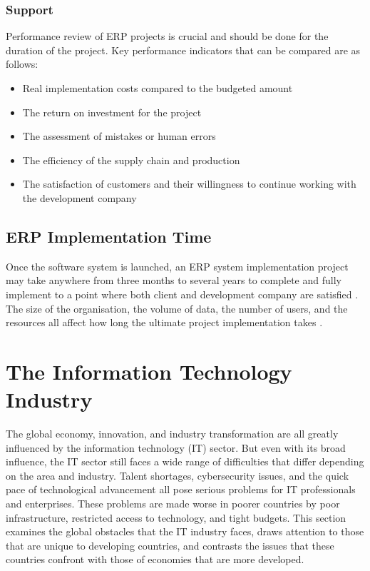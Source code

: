 \subsubsection{Support}
\par{Performance review of ERP projects is crucial and should be done for the duration of the project. Key performance indicators that can be compared are as follows:}
\begin{itemize}
    \item Real implementation costs compared to the budgeted amount
    \item The return on investment for the project
    \item The assessment of mistakes or human errors
    \item The efficiency of the supply chain and production
    \item The satisfaction of customers and their willingness to continue working with the development company
\end{itemize}
\subsection{ERP Implementation Time}
\par{Once the software system is launched, an ERP system implementation project may take anywhere from three months to several years to complete and fully implement to a point where both client and development company are satisfied \citep{sankar2006implementation}. The size of the organisation, the volume of data, the number of users, and the resources all affect how long the ultimate project implementation takes \citep{pelphrey2015directing}.}

\section{The Information Technology Industry}
\par{The global economy, innovation, and industry transformation are all greatly influenced by the information technology (IT) sector. But even with its broad influence, the IT sector still faces a wide range of difficulties that differ depending on the area and industry. Talent shortages, cybersecurity issues, and the quick pace of technological advancement all pose serious problems for IT professionals and enterprises. These problems are made worse in poorer countries by poor infrastructure, restricted access to technology, and tight budgets. This section examines the global obstacles that the IT industry faces, draws attention to those that are unique to developing countries, and contrasts the issues that these countries confront with those of economies that are more developed.}

